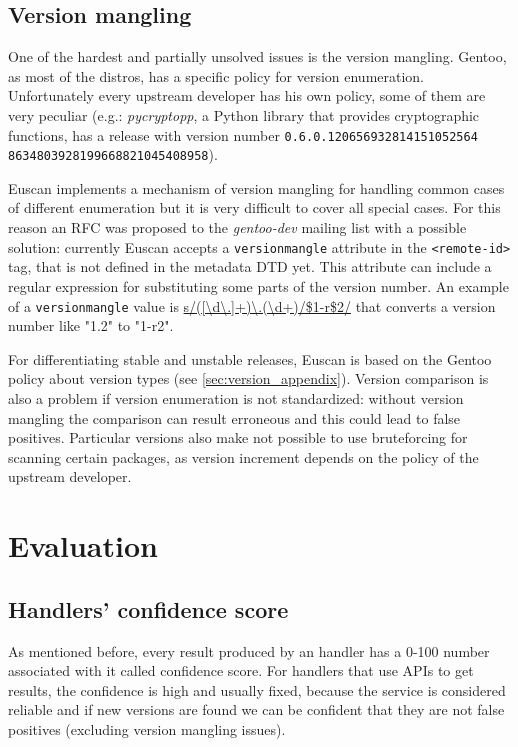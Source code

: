 \subsection{Version mangling}
One of the hardest and partially unsolved issues is the version mangling. Gentoo, as most of the distros, has a specific policy for version enumeration. Unfortunately every upstream developer has his own policy, some of them are very peculiar (e.g.: \emph{pycryptopp}, a Python library that provides cryptographic functions, has a release with version number \texttt{0.6.0.120656932814151052564 
8634803928199668821045408958}).

Euscan implements a mechanism of version mangling for handling common cases of different enumeration but it is very difficult to cover all special cases. For this reason an RFC \cite{fox_rfc} was proposed to the \emph{gentoo-dev} mailing list with a possible solution: currently Euscan accepts a \texttt{versionmangle} attribute in the \texttt{<remote-id>} tag, that is not defined in the metadata DTD yet. This attribute can include a regular expression for substituting some parts of the version number. An example of a \texttt{versionmangle} value is \url{s/([\d\.]+)\.(\d+)/\$1-r\$2/} that converts a version number like "1.2" to "1-r2".

For differentiating stable and unstable releases, Euscan is based on the Gentoo policy about version types (see \ref{sec:version_appendix}).
Version comparison is also a problem if version enumeration is not standardized: without version mangling the comparison can result erroneous and this could lead to false positives.
Particular versions also make not possible to use bruteforcing for scanning certain packages, as version increment depends on the policy of the upstream developer.

\section{Evaluation}
\subsection{Handlers' confidence score}
As mentioned before, every result produced by an handler has a 0-100 number associated with it called confidence score. For handlers that use APIs to get results, the confidence is high and usually fixed, because the service is considered reliable and if new versions are found we can be confident that they are not false positives (excluding version mangling issues).


